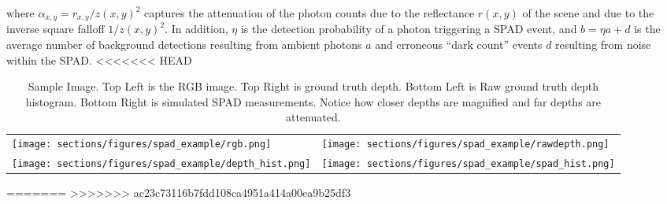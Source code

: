 where $\alpha_{x,y} = r_{x,y}/z(x,y)^2$ captures the attenuation of the
photon counts due to the reflectance $r(x,y)$ of the scene and due to the
inverse square falloff $1/z(x,y)^2$.
In addition, $\eta$ is the detection probability of a photon
triggering a SPAD event, and $b = \eta a + d$ is the average number of background detections resulting
from ambient photons $a$
and erroneous ``dark count'' events $d$ resulting from noise within the SPAD.
<<<<<<< HEAD
\newpage
\begin{table}[htbp]
  \begin{center}
    \begin{tabularx}{\linewidth}{*{2}{X}}
      \texttt{[image: sections/figures/spad\_example/rgb.png]} &
      \texttt{[image: sections/figures/spad\_example/rawdepth.png]} \\
      \texttt{[image: sections/figures/spad\_example/depth\_hist.png]} &
      \texttt{[image: sections/figures/spad\_example/spad\_hist.png]} \\
    \end{tabularx}
  \end{center}
  \caption{Sample Image. Top Left is the RGB image. Top Right is ground truth
    depth. Bottom Left is Raw ground truth depth histogram. Bottom Right is
    simulated SPAD measurements. Notice how closer depths are magnified and far
    depths are attenuated.}
\end{table}
=======
>>>>>>> ac23c73116b7fdd108ca4951a414a00ea9b25df3

